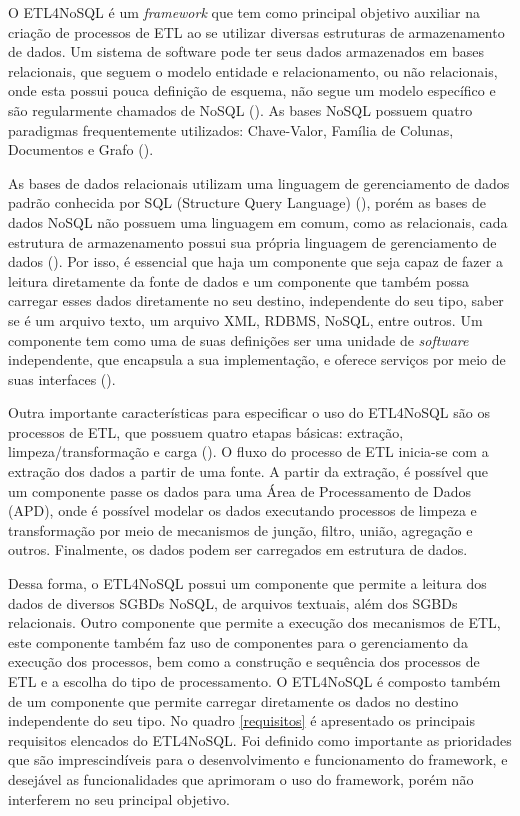 O ETL4NoSQL é um \textit{framework} que tem como principal objetivo auxiliar na criação de processos de ETL ao se utilizar diversas estruturas de armazenamento de dados. Um sistema de software pode ter seus dados armazenados em bases relacionais, que seguem o modelo entidade e relacionamento, ou não relacionais, onde esta possui pouca definição de esquema, não segue um modelo específico e são regularmente chamados de NoSQL (\cite{fowler:2013}). As bases NoSQL possuem quatro paradigmas frequentemente utilizados: Chave-Valor, Família de Colunas, Documentos e Grafo (\cite{fowler:2013}).

As bases de dados relacionais utilizam uma linguagem de gerenciamento de dados padrão conhecida por SQL (Structure Query Language) (\cite{fowler:2013}), porém as bases de dados NoSQL não possuem uma linguagem em comum, como as relacionais, cada estrutura de armazenamento possui sua própria linguagem de gerenciamento de dados (\cite{fowler:2013}). Por isso, é essencial que haja um componente que seja capaz de fazer a leitura diretamente da fonte de dados e um componente que também possa carregar esses dados diretamente no seu destino, independente do seu tipo, saber se é um arquivo texto,  um arquivo XML, RDBMS, NoSQL, entre outros. Um componente tem como uma de suas definições ser uma unidade de \textit{software} independente, que encapsula a sua implementação, e oferece serviços por meio de suas interfaces (\cite{itana:2005}).

Outra importante características para especificar o uso do ETL4NoSQL são os processos de ETL, que possuem quatro etapas básicas: extração, limpeza/transformação e carga (\cite{kimball:2004}). O fluxo do processo de ETL inicia-se com a extração dos dados a partir de uma fonte. A partir da extração, é possível que um componente passe os dados para uma Área de Processamento de Dados (APD), onde é possível modelar os dados executando processos de limpeza e transformação por meio de mecanismos de junção, filtro, união, agregação e outros. Finalmente, os dados podem ser carregados em estrutura de dados.

Dessa forma, o ETL4NoSQL possui um componente que permite a leitura dos dados de diversos SGBDs NoSQL, de arquivos textuais, além dos SGBDs relacionais. Outro componente que permite a execução dos mecanismos de ETL, este componente também faz uso de componentes para o gerenciamento da execução dos processos, bem como a construção e sequência dos processos de ETL e a escolha do tipo de processamento. O ETL4NoSQL é composto também de um componente que permite carregar diretamente os dados no destino independente do seu tipo. No quadro \ref{requisitos} é apresentado os principais requisitos elencados do ETL4NoSQL. Foi definido como importante as prioridades que são imprescindíveis para o desenvolvimento e funcionamento do framework, e desejável as funcionalidades que aprimoram o uso do framework, porém não interferem no seu principal objetivo.

